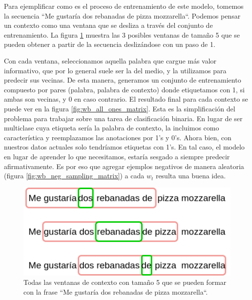 Para ejemplificar como es el proceso de entrenamiento de este modelo, tomemos la
secuencia ``Me gustaría dos rebanadas de pizza mozzarella``. Podemos pensar un
contexto como una ventana que se desliza a través del conjunto de entrenamiento.
La figura \ref{fig:wb_slices} muestra las 3 posibles ventanas de tamaño 5 que se pueden obtener
a partir de la secuencia deslizándose con un paso de 1.

Con cada ventana, seleccionamos aquella palabra que cargue más valor
informativo, que por lo general suele ser la del medio, y la utilizamos para
predecir sus vecinas. De esta manera, generamos un conjunto de entrenamiento
compuesto por pares (palabra, palabra de contexto) donde etiquetamos con 1, si
ambas son vecinas, y 0 en caso contrario. El resultado final para cada contexto
se puede ver en la figura \ref{fig:wb_all_ones_matrix}. Esta es la simplificación del problema para
trabajar sobre una tarea de clasificación binaria. En lugar de ser multiclase
cuya  etiqueta sería la palabra de contexto, la incluimos como característica y
reemplazamos las anotaciones por 1's y 0's. Ahora bien, con nuestros datos
actuales solo tendríamos etiquetas con 1's. En tal caso, el modelo en lugar de
aprender lo que necesitamos, estaría sesgado a siempre predecir afirmativamente.
Es por eso que agregar ejemplos negativos de manera aleatoria (figura \ref{fig:wb_neg_sampling_matrix}) a
cada $w_t$ resulta una buena idea.

\begin{figure}
    \centering
    \includegraphics[scale=0.60]{figures/context_example_1.png}
    \caption{Todas las ventanas de contexto con tamaño 5 que se pueden formar con la frase
             ``Me gustaría dos rebanadas de pizza mozzarella``.}
    \label{fig:wb_slices}
\end{figure}

